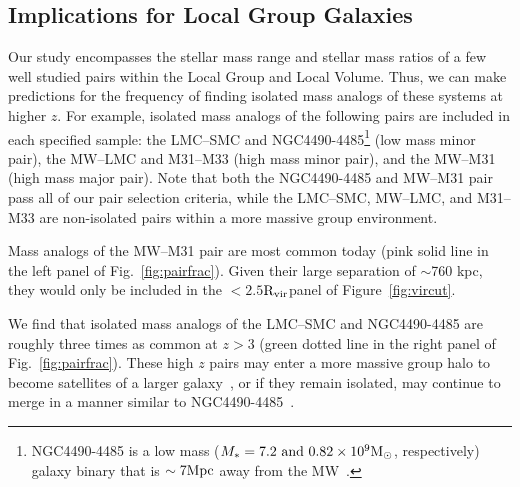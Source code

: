 \documentclass[twocolumn]{aastex631}
\newcommand{\Rvir}{\ensuremath{\rm R_{vir}}}
\begin{document}

   \subsection{Implications for Local Group Galaxies}\label{sec:disc-LG}
    Our study encompasses the stellar mass range and stellar mass ratios of a few well studied pairs within the Local Group and Local Volume.
    Thus, we can make predictions for the frequency of finding isolated mass analogs of these systems at higher $z$. 
    For example, isolated mass analogs of the following pairs are included in each specified sample:
    the LMC--SMC and NGC4490-4485\footnote{NGC4490-4485 is a low mass ($M_* = 7.2 \mbox{ and } 0.82 \times 10^9\mathrm{M}_\odot$, respectively) galaxy binary that is $\sim7\mathrm{Mpc}$ away from the MW~\citep{Theureau2007,pearson18}.} (low mass minor pair), the MW--LMC and M31--M33 (high mass minor pair), and the MW--M31 (high mass major pair).
    Note that both the NGC4490-4485 and MW--M31 pair pass all of our pair selection criteria, while the LMC--SMC,  MW--LMC, and M31--M33 are non-isolated pairs within a more massive group environment.

    Mass analogs of the MW--M31 pair are most common today (pink solid line in the left panel of Fig.~\ref{fig:pairfrac}). 
    Given their large separation of $\sim$760 kpc, they would only be included in the $<2.5$\Rvir panel of Figure~\ref{fig:vircut}. 

    We find that isolated mass analogs of the LMC--SMC and NGC4490-4485 are roughly three times as common at $z>3$ (green dotted line in the right panel of Fig.~\ref{fig:pairfrac}). 
    These high $z$ pairs may enter a more massive group halo to become satellites of a larger galaxy~\citep[like the LMC--SMC, ][]{Besla2007,Patel2017a-Orbits}, or if they remain isolated, may continue to merge in a manner similar to NGC4490-4485~\citep{pearson18}. 
    
\end{document}
